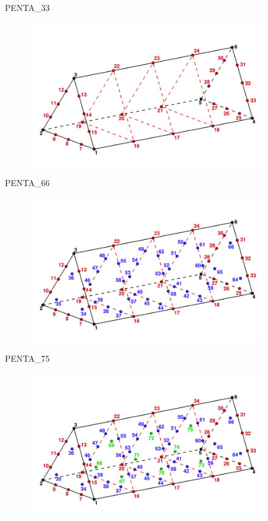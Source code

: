 {{{\newpage
{}

PENTA\_33
\begin{figure}[!htb]
   \includegraphics[width=4in]{conv.figs/TecplotFiles_Quartic_Element/All_Figures/Penta_33}
\end{figure}

\bigskip

PENTA\_66
\begin{figure}[!htb]
   \includegraphics[width=4in]{conv.figs/TecplotFiles_Quartic_Element/All_Figures/Penta_66}
\end{figure}

\newpage
PENTA\_75
\begin{figure}[!htb]
   \includegraphics[width=4in]{conv.figs/TecplotFiles_Quartic_Element/All_Figures/Penta_75}
\end{figure}

}}}
